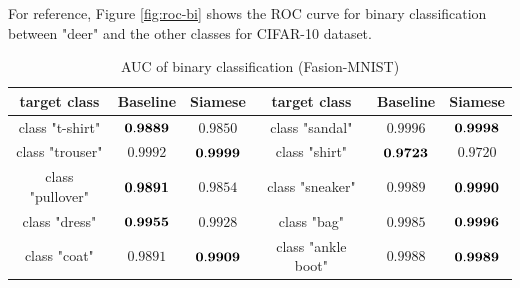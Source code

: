 \documentclass[a4paper,12pt]{article}
\begin{document}


For reference, Figure \ref{fig:roc-bi} shows the ROC curve for binary classification between "deer" and the other classes for CIFAR-10 dataset.

\begin{table}[ht]
\begin{center}
\caption{AUC of binary classification (Fasion-MNIST)}
\label{tabel:AUC_Fashion_binary}
\begin{tabular}{|c|c|c||c|c|c|} \hline
target class & Baseline & Siamese & target class &  Baseline & Siamese  \\ \hline \hline
class "t-shirt" &  ${\bf 0.9889}$       &     $0.9850$            &   class "sandal"        &  $0.9996$   &  ${\bf 0.9998}$   \\ \hline
class "trouser" &    $0.9992$   &         ${\bf 0.9999}$        &  class "shirt"          & ${\bf 0.9723}$   &   $0.9720$   \\ \hline
class "pullover" &    ${\bf 0.9891}$         &  $0.9854$               &  class "sneaker"          &  $0.9989$  &  ${\bf 0.9990}$    \\ \hline
class "dress" &   ${\bf 0.9955}$          &    $0.9928$            &     class "bag"      & $0.9985$       & ${\bf 0.9996}$ \\ \hline
class "coat" &   $0.9891$          &         ${\bf 0.9909}$       &    class "ankle boot"          & $0.9988$   & ${\bf0.9989}$    \\ \hline
\end{tabular}
\end{center}
\end{table}
\end{document}
